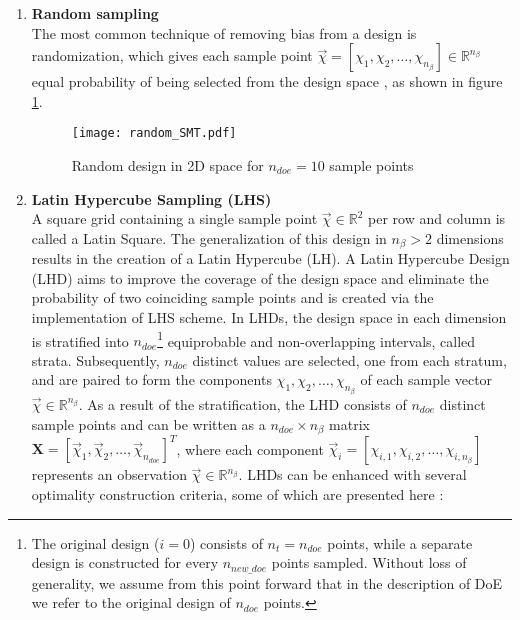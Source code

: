 \begin{enumerate}
\item \textbf{Random sampling} \\
The most common technique of removing bias from a design is 
randomization, which gives each sample point $\vec{χ} \!= \! 
[χ_{1}, χ_{2}, \hdots, χ_{n_{β}}] \in \mathbb{R}^{n_{β}}$ 
equal probability of being selected from the design 
space \cite{Random}, as shown in figure \ref{fig:random}. 

\vspace{-4mm}
  
\begin{figure}[h!]
    \centering
    \texttt{[image: random\_SMT.pdf]} 
    \caption{Random design in 2D space for $n_{doe} \!= \!10$ 
    sample points}
    \label{fig:random}   
\end{figure}

\item \textbf{Latin Hypercube Sampling (LHS)}  \\ 
A square grid containing a single sample point $\vec{χ} \in 
\mathbb{R}^{2}$ per row and column is called a Latin Square.
The generalization of this design in $n_{β} \!> \!2$ dimensions 
results in the creation of a Latin Hypercube (LH)\cite{Latin 
Hypercube}. A Latin Hypercube Design (LHD) aims to improve the 
coverage of the design space and eliminate the probability of two 
coinciding sample points and is created via the implementation of 
LHS\cite{LHS, LHS method} scheme. In LHDs, the design space in 
each dimension is stratified into $n_{doe}$\footnote{The original 
design ($i=0$) consists of $n_{t} = n_{doe}$ points, while a 
separate design is constructed for every $n_{new\_doe}$ points 
sampled. Without loss of generality, we assume from this point 
forward that in the description of DoE we refer to the original 
design of $n_{doe}$ points.} equiprobable and non-overlapping 
intervals\cite{LHS}, called strata. Subsequently, $n_{doe}$ 
distinct values are selected, one from each stratum, and are 
paired to form the components $χ_{1}, χ_{2}, \hdots, χ_{n_{β}}$ of 
each sample vector $\vec{χ} \!\in \!\mathbb{R}^{n_{β}}$. As a 
result of the stratification, the LHD consists of $n_{doe}$ 
distinct sample points and can be written as a $n_{doe} \times 
n_{β}$ matrix $\mathbf{X} = [\vec{χ}_{1}, \vec{χ}_{2}, \hdots, 
\vec{χ}_{n_{doe}}]^T$, where each component $\vec{χ}_{i} = [χ_{i,
1}, χ_{i,2},\hdots, χ_{i,n_{β}}]$ represents an observation 
$\vec{χ} \in \mathbb{R}^{n_{β}}$. LHDs can be enhanced with 
several optimality construction criteria, some of which are 
presented here \cite{preprint_SMT,pyDOE}:


\end{enumerate}
